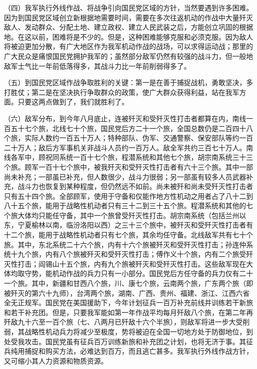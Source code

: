 \documentclass[UTF-8, a5paper, 12pt]{ctexart}
\begin{document}
（四）我军执行外线作战、将战争引向国民党区域的方针，当然要遇到许多困难。因为到国民党区域创立新根据地需要时间，需要在多次往返机动的作战中大量歼灭敌人、发动群众、分配土地、建立政权、建立人民武装之后，方能创立巩固的根据地。在这以前，困难将是不少的。但是，这种困难能够克服和必须克服。因为敌人将被迫更加分散，有广大地区作为我军机动作战的战场，可以求得运动战；那里的广大民众是痛恨国民党拥护我军的；虽然部分敌军仍然有较强的战斗力，但一般地敌军士气比一年前低落得多，其战斗力比一年前削弱得多了。

（五）到国民党区域作战争取胜利的关键：第一是在善于捕捉战机，勇敢坚决，多打胜仗；第二是在坚决执行争取群众的政策，使广大群众获得利益，站在我军方面。只要这两点做到了，我们就胜利了。

（六）敌军分布，到今年八月底止，连被歼灭和受歼灭性打击者都算在内，南线一百五十七个旅，北线七十个旅，国民党后方二十一个旅，全国总数仍是二百四十八个旅，实际人数约一百五十万人；特种部队、伪军、交通警察、保安部队等约一百二十万人；敌后方军事机关非战斗人员约一百万人。敌全军共约三百七十万人。南线各军中，顾祝同系统一百十七个旅，程潜系统和其他七个旅，胡宗南系统三十三个旅。顾军一百十七个旅中，被我歼灭和受歼灭性打击者有六十三个旅。其中一部尚未补充；一部虽已补充，但人数很少，战斗力很弱；另一部虽有较多人员武器补充，战斗力也恢复到某种程度，但仍然远不如前。尚未被歼和尚未受歼灭性打击者只有五十四个旅。全部顾军，使用于守备和仅能作地方性机动之用者占了八十二到八十五个旅，能用于战略性机动者只有三十二到三十五个旅。程潜系统和其他的七个旅大体均只能任守备，其中一个旅曾受歼灭性打击。胡宗南系统（包括兰州以东，宁夏榆林以南，临汾洛阳以西）之三十三个旅中，被歼灭和受歼灭性打击者有十二个旅，能用于战略性机动者只有七个旅，其余均任守备。北线敌军共有七十个旅。其中，东北系统二十六个旅，内有十六个旅被歼灭和受歼灭性打击；孙连仲系统十九个旅，内有八个旅被歼灭和受歼灭性打击；傅作义十个旅，内有二个旅受歼灭性打击；阎锡山十五个旅，内有九个旅被歼灭和受歼灭性打击。这些敌军现在大体均取守势，能机动作战的兵力只有一小部分。国民党后方任守备的兵力仅有二十一个旅。其中，新疆和甘西八个旅，川、康七个旅，云南两个旅，广东两个旅（即被歼灭的第六十九师），台湾两个旅，湖南、广西、贵州、福建、浙江、江西六省全无正规军。国民党在美国援助下，今年计划征兵一百万补充前线并训练若干新旅和若干补充团。但是，只要我军能如第一年作战平均每月歼敌八个旅，在第二年再歼敌九十六至一百个旅（七、八两月已歼敌十六个半旅），则敌军将进一步大受削弱，其战略性机动兵力将减少至极度，势将被迫在全国一切地方处于防御地位，到处受我攻击。国民党虽有征兵百万训练新旅和补充团之计划，也将无济于事。其征兵纯用捕捉和购买方法，必难达到百万，而且逃亡甚多。我军执行外线作战方针，又可缩小其人力资源和物质资源。
\end{document}
